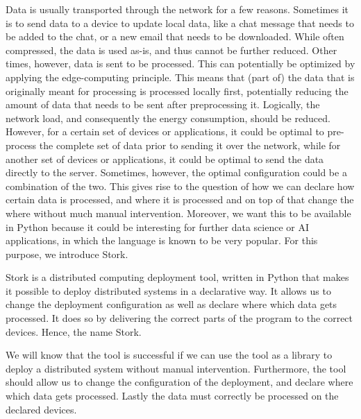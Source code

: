 \documentclass[a4paper]{article}
\begin{document}
Data is usually transported through the network for a few reasons. Sometimes it is to send data to a device to update local data, like a chat message that needs to be added to the chat, or a new email that needs to be downloaded. While often compressed, the data is used as-is, and thus cannot be further reduced. Other times, however, data is sent to be processed. This can potentially be optimized by applying the edge-computing principle. This means that (part of) the data that is originally meant for processing is processed locally first, potentially reducing the amount of data that needs to be sent after preprocessing it. Logically, the network load, and consequently the energy consumption, should be reduced. However, for a certain set of devices or applications, it could be optimal to pre-process the complete set of data prior to sending it over the network, while for another set of devices or applications, it could be optimal to send the data directly to the server. Sometimes, however, the optimal configuration could be a combination of the two. This gives rise to the question of how we can declare how certain data is processed, and where it is processed and on top of that change the where without much manual intervention. Moreover, we want this to be available in Python because it could be interesting for further data science\cite{datasciencelanguage} or AI applications, in which the language is known to be very popular. For this purpose, we introduce Stork.

Stork is a distributed computing deployment tool, written in Python that makes it possible to deploy distributed systems in a declarative way. It allows us to change the deployment configuration as well as declare where which data gets processed. It does so by delivering the correct parts of the program to the correct devices. Hence, the name Stork.

We will know that the tool is successful if we can use the tool as a library to deploy a distributed system without manual intervention. Furthermore, the tool should allow us to change the configuration of the deployment, and declare where which data gets processed. Lastly the data must correctly be processed on the declared devices.
\end{document}
